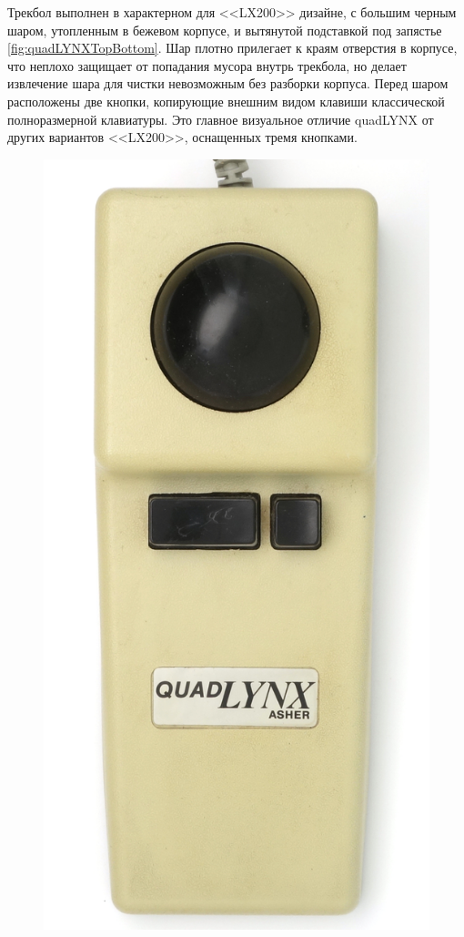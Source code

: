 \documentclass[11pt, a4paper]{article}
\begin{document}
Трекбол выполнен в характерном для <<LX200>> дизайне, с большим черным шаром, утопленным в бежевом корпусе, и вытянутой подставкой под запястье \ref{fig:quadLYNXTopBottom}. Шар плотно прилегает к краям отверстия в корпусе, что неплохо защищает от попадания мусора внутрь трекбола, но делает извлечение шара для чистки невозможным без разборки корпуса. Перед шаром расположены две кнопки, копирующие внешним видом клавиши классической полноразмерной клавиатуры. Это главное визуальное отличие quadLYNX от других вариантов <<LX200>>, оснащенных тремя кнопками.

\begin{figure}[h]
    \centering
    \includegraphics[scale=0.4]{1986_honeywell_asher_quadlynx_trackball/top_30.jpg}

\end{figure}
\end{document}
